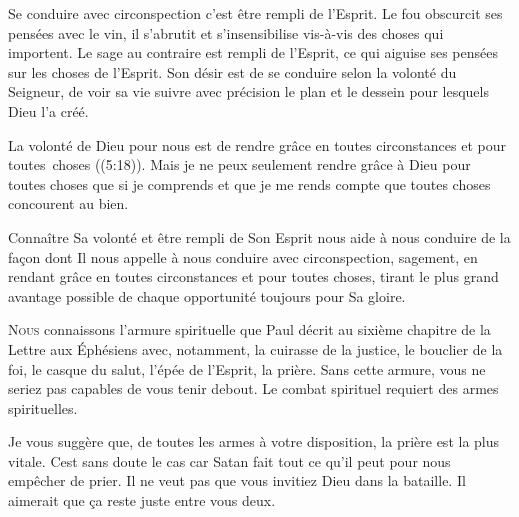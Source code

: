 
Se conduire avec circonspection c'est être rempli de l'Esprit.
 Le fou obscurcit ses pensées avec le vin, il s'abrutit et s'insensibilise
 vis-à-vis des choses qui importent. Le sage au contraire est rempli
 de l'Esprit, ce qui aiguise ses pensées sur les choses de l'Esprit.
 Son désir est de se conduire selon la volonté du Seigneur, 
 de voir sa vie suivre avec précision le plan et le dessein
 pour lesquels Dieu l'a créé.

La volonté de Dieu pour nous est de rendre grâce en toutes circonstances
 et pour toutes~choses ((5:18)).
 Mais je ne peux seulement rendre grâce à Dieu pour toutes choses
 que si je comprends et que je me rends compte que toutes choses
 concourent au bien.

Connaître Sa volonté et être rempli de Son Esprit nous aide 
 à nous conduire de la façon dont Il nous appelle à nous conduire
 \ocadr avec circonspection, sagement, en rendant grâce en toutes circonstances
 et pour toutes choses, tirant le plus grand avantage possible
 de chaque opportunité \fcadr{} toujours pour Sa gloire.

\dvrule






\lettrine{N}{ous} connaissons l'armure spirituelle que Paul décrit
 au sixième chapitre de la Lettre aux Éphésiens avec, notamment,
 la cuirasse de la justice, le bouclier de la foi, le casque du salut,
 l'épée de l'Esprit, la prière. Sans cette armure,
 vous ne seriez pas capables de vous tenir debout.
 Le combat spirituel requiert des armes spirituelles.

Je vous suggère que, de toutes les armes à votre disposition,
 la prière est la plus vitale. Cest sans doute le cas car Satan
 fait tout ce qu'il peut pour nous empêcher de prier.
 Il ne veut pas que vous invitiez Dieu dans la bataille.
 Il aimerait que ça reste juste entre vous deux.

